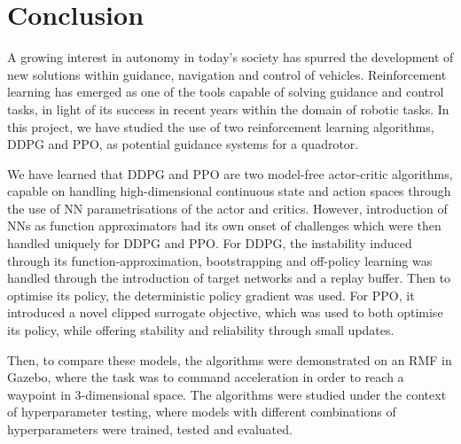 \chapter{Conclusion}
\label{chap:conclusion}

\begin{comment}
A concise summary of essential information and findings in the project.
\end{comment}

A growing interest in autonomy in today's society has spurred the development of new solutions within guidance, navigation and control of vehicles. Reinforcement learning has emerged as one of the tools capable of solving guidance and control tasks, in light of its success in recent years within the domain of robotic tasks.
In this project, we have studied the use of two reinforcement learning algorithms, DDPG and PPO, as potential guidance systems for a quadrotor.

We have learned that DDPG and PPO are two model-free actor-critic algorithms, capable on handling high-dimensional continuous state and action spaces through the use of NN parametrisations of the actor and critics. However, introduction of NNs as function approximators had its own onset of challenges which were then handled uniquely for DDPG and PPO. 
For DDPG, the instability induced through its function-approximation, bootstrapping and off-policy learning was handled through the introduction of target networks and a replay buffer. Then to optimise its policy, the deterministic policy gradient was used.
For PPO, it introduced a novel clipped surrogate objective, which was used to both optimise its policy, while offering stability and reliability through small updates.

Then, to compare these models, the algorithms were demonstrated on an RMF in Gazebo, where the task was to command acceleration in order to reach a waypoint in 3-dimensional space. The algorithms were studied under the context of hyperparameter testing, where models with different combinations of hyperparameters were trained, tested and evaluated.

